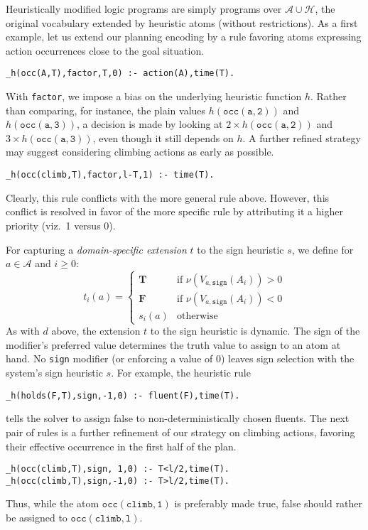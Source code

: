 \documentclass[letterpaper]{article}
\newcommand{\true}{\ensuremath{\boldsymbol{T}}}
\newcommand{\false}{\ensuremath{\boldsymbol{F}}}
\newcommand{\ass}{\ensuremath{A}}
\begin{document}
Heuristically modified logic programs are simply programs over $\mathcal{A}\cup\mathcal{H}$,
the original vocabulary extended by heuristic atoms (without restrictions).
As a first example,
let us extend our planning encoding by a rule favoring atoms expressing action occurrences close to
the goal situation.
\begin{lstlisting}
_h(occ(A,T),factor,T,0) :- action(A),time(T).
\end{lstlisting}
With \texttt{factor}, we impose a bias on the underlying heuristic function $h$.
Rather than comparing, for instance,
the plain values $h(\mathtt{occ(a,2)})$ and $h(\mathtt{occ(a,3)})$,
a decision is made by looking at $2\times h(\mathtt{occ(a,2)})$ and  $3\times h(\mathtt{occ(a,3)})$,
even though it still depends on $h$.
A further refined strategy may suggest considering climbing actions as early as possible.
\begin{lstlisting}
_h(occ(climb,T),factor,l-T,1) :- time(T).
\end{lstlisting}
Clearly, this rule conflicts with the more general rule above.
However, this conflict is resolved in favor of the more specific rule by attributing it a higher
priority (viz.~1 versus 0).


For capturing a \emph{domain-specific extension} $t$ to the sign heuristic $s$,
we define for $a\in\mathcal{A}$ and $i\geq 0$:
\[
t_i(a)=
\left\{
  \begin{array}{rl}
    \true &\text{if }
           \nu(V_{a,\mathtt{sign}}(\ass_i))>0
           \\
    \false&\text{if }
           \nu(V_{a,\mathtt{sign}}(\ass_i))<0
           \\
    s_i(a)&\text{otherwise}
  \end{array}
\right.
\]
As with $d$ above, the extension $t$ to the sign heuristic is dynamic.
The sign of the modifier's preferred value determines the truth value to assign to an atom at hand.
No \texttt{sign} modifier (or enforcing a value of 0) leaves sign selection with the system's sign heuristic $s$.
%
For example, the heuristic rule
\begin{lstlisting}
_h(holds(F,T),sign,-1,0) :- fluent(F),time(T).
\end{lstlisting}
tells the solver to assign false to non-deterministically chosen fluents.
%
The next pair of rules is a further refinement of our strategy on climbing actions,
favoring their effective occurrence in the first half of the plan.
\begin{lstlisting}
_h(occ(climb,T),sign, 1,0) :- T<l/2,time(T).
_h(occ(climb,T),sign,-1,0) :- T>l/2,time(T).
\end{lstlisting}
Thus, while the atom $\mathtt{occ(climb,1)}$ is preferably made true,
false should rather be assigned to $\mathtt{occ(climb,l)}$.
\end{document}
